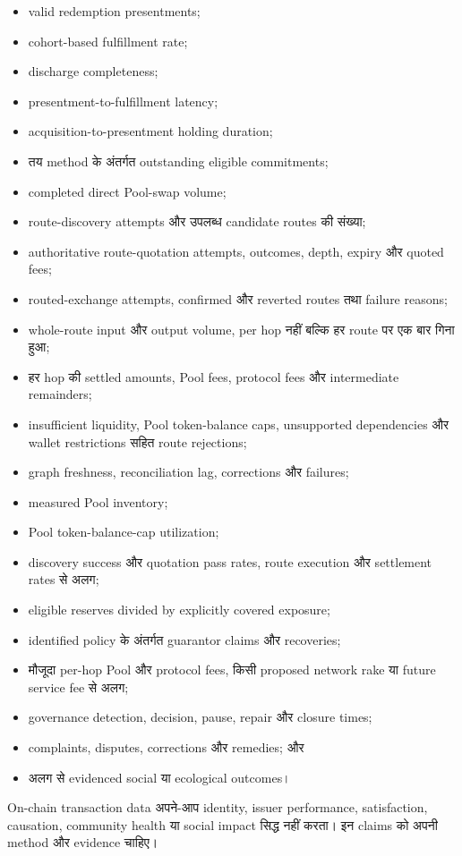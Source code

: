 \documentclass[11pt]{article}
\begin{document}
\begin{itemize}[leftmargin=*]
\item valid redemption presentments;
\item cohort-based fulfillment rate;
\item discharge completeness;
\item presentment-to-fulfillment latency;
\item acquisition-to-presentment holding duration;
\item तय method के अंतर्गत outstanding eligible commitments;
\item completed direct Pool-swap volume;
\item route-discovery attempts और उपलब्ध candidate routes की संख्या;
\item authoritative route-quotation attempts, outcomes, depth, expiry और quoted fees;
\item routed-exchange attempts, confirmed और reverted routes तथा failure reasons;
\item whole-route input और output volume, per hop नहीं बल्कि हर route पर एक बार गिना हुआ;
\item हर hop की settled amounts, Pool fees, protocol fees और intermediate remainders;
\item insufficient liquidity, Pool token-balance caps, unsupported dependencies और wallet restrictions सहित route rejections;
\item graph freshness, reconciliation lag, corrections और failures;
\item measured Pool inventory;
\item Pool token-balance-cap utilization;
\item discovery success और quotation pass rates, route execution और settlement rates से अलग;
\item eligible reserves divided by explicitly covered exposure;
\item identified policy के अंतर्गत guarantor claims और recoveries;
\item मौजूदा per-hop Pool और protocol fees, किसी proposed network rake या future service fee से अलग;
\item governance detection, decision, pause, repair और closure times;
\item complaints, disputes, corrections और remedies; और
\item अलग से evidenced social या ecological outcomes।
\end{itemize}
On-chain transaction data अपने-आप identity, issuer performance, satisfaction, causation, community health या social impact सिद्ध नहीं करता। इन claims को अपनी method और evidence चाहिए।
\end{document}
